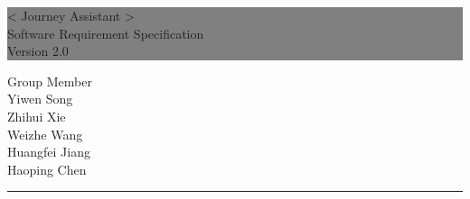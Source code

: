 \documentclass[10pt]{article}
\begin{document}

\begin{titlepage} %
	
	
	\colorbox{grey}{
		\parbox[t]{1.1\textwidth}{ %
			\parbox[t]{1.02\textwidth}{ %
				\raggedleft %
				\fontsize{34pt}{40pt}\selectfont %
				\vspace{0.7cm} %
				
				< Journey Assistant >\\
                Software Requirement Specification\\
                Version 2.0\\
				
				\vspace{0.7cm} %
			}
		}
	}
	
	\vfill %
	
	
	\parbox[t]{1\textwidth}{ %
		\raggedleft %
		\large %
		{\Large Group Member}\\[4pt] %
        Yiwen Song\\
        Zhihui Xie\\
        Weizhe Wang\\
        Huangfei Jiang\\
        Haoping Chen\\
		
		\hfill\rule{0.2\linewidth}{1pt}%
    }
    
	
\end{titlepage}
\end{document}
